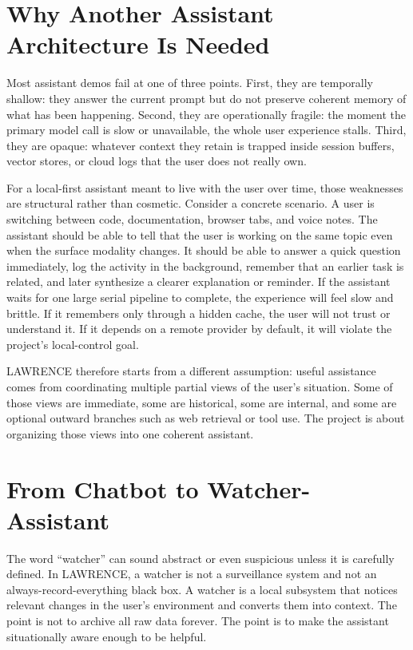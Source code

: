 \documentclass[conference]{IEEEtran}
\begin{document}
\section{Why Another Assistant Architecture Is Needed}
Most assistant demos fail at one of three points. First, they are temporally shallow: they answer the current prompt but do not preserve coherent memory of what has been happening. Second, they are operationally fragile: the moment the primary model call is slow or unavailable, the whole user experience stalls. Third, they are opaque: whatever context they retain is trapped inside session buffers, vector stores, or cloud logs that the user does not really own.

For a local-first assistant meant to live with the user over time, those weaknesses are structural rather than cosmetic. Consider a concrete scenario. A user is switching between code, documentation, browser tabs, and voice notes. The assistant should be able to tell that the user is working on the same topic even when the surface modality changes. It should be able to answer a quick question immediately, log the activity in the background, remember that an earlier task is related, and later synthesize a clearer explanation or reminder. If the assistant waits for one large serial pipeline to complete, the experience will feel slow and brittle. If it remembers only through a hidden cache, the user will not trust or understand it. If it depends on a remote provider by default, it will violate the project's local-control goal.

LAWRENCE therefore starts from a different assumption: useful assistance comes from coordinating multiple partial views of the user's situation. Some of those views are immediate, some are historical, some are internal, and some are optional outward branches such as web retrieval or tool use. The project is about organizing those views into one coherent assistant.

\section{From Chatbot to Watcher-Assistant}
The word ``watcher'' can sound abstract or even suspicious unless it is carefully defined. In LAWRENCE, a watcher is not a surveillance system and not an always-record-everything black box. A watcher is a local subsystem that notices relevant changes in the user's environment and converts them into context. The point is not to archive all raw data forever. The point is to make the assistant situationally aware enough to be helpful.
\end{document}
